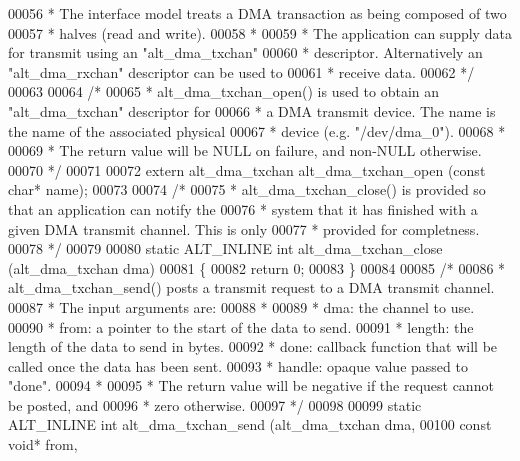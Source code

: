 \begin{DoxyCode}
00056 \textcolor{comment}{ * The interface model treats a DMA transaction as being composed of two }
00057 \textcolor{comment}{ * halves (read and write). }
00058 \textcolor{comment}{ *}
00059 \textcolor{comment}{ * The application can supply data for transmit using an "alt\_dma\_txchan"}
00060 \textcolor{comment}{ * descriptor. Alternatively an "alt\_dma\_rxchan" descriptor can be used to}
00061 \textcolor{comment}{ * receive data.}
00062 \textcolor{comment}{ */}
00063 
00064 \textcolor{comment}{/*}
00065 \textcolor{comment}{ * alt\_dma\_txchan\_open() is used to obtain an "alt\_dma\_txchan" descriptor for}
00066 \textcolor{comment}{ * a DMA transmit device. The name is the name of the associated physical}
00067 \textcolor{comment}{ * device (e.g. "/dev/dma\_0").}
00068 \textcolor{comment}{ *}
00069 \textcolor{comment}{ * The return value will be NULL on failure, and non-NULL otherwise. }
00070 \textcolor{comment}{ */}
00071 
00072 \textcolor{keyword}{extern} alt_dma_txchan alt_dma_txchan_open (\textcolor{keyword}{const} \textcolor{keywordtype}{char}* name);
00073 
00074 \textcolor{comment}{/*}
00075 \textcolor{comment}{ * alt\_dma\_txchan\_close() is provided so that an application can notify the }
00076 \textcolor{comment}{ * system that it has finished with a given DMA transmit channel. This is only}
00077 \textcolor{comment}{ * provided for completness.}
00078 \textcolor{comment}{ */}
00079 
00080 \textcolor{keyword}{static} ALT_INLINE \textcolor{keywordtype}{int} alt_dma_txchan_close (alt_dma_txchan dma)
00081 \{
00082   \textcolor{keywordflow}{return} 0;
00083 \}
00084 
00085 \textcolor{comment}{/*}
00086 \textcolor{comment}{ * alt\_dma\_txchan\_send() posts a transmit request to a DMA transmit channel.}
00087 \textcolor{comment}{ * The input arguments are:}
00088 \textcolor{comment}{ *}
00089 \textcolor{comment}{ * dma: the channel to use.}
00090 \textcolor{comment}{ * from: a pointer to the start of the data to send.}
00091 \textcolor{comment}{ * length: the length of the data to send in bytes.}
00092 \textcolor{comment}{ * done: callback function that will be called once the data has been sent.}
00093 \textcolor{comment}{ * handle: opaque value passed to "done".}
00094 \textcolor{comment}{ *}
00095 \textcolor{comment}{ * The return value will be negative if the request cannot be posted, and}
00096 \textcolor{comment}{ * zero otherwise.}
00097 \textcolor{comment}{ */}
00098 
00099 \textcolor{keyword}{static} ALT_INLINE \textcolor{keywordtype}{int} alt_dma_txchan_send (alt_dma_txchan dma, 
00100              \textcolor{keyword}{const} \textcolor{keywordtype}{void}* from, 

\end{DoxyCode}
